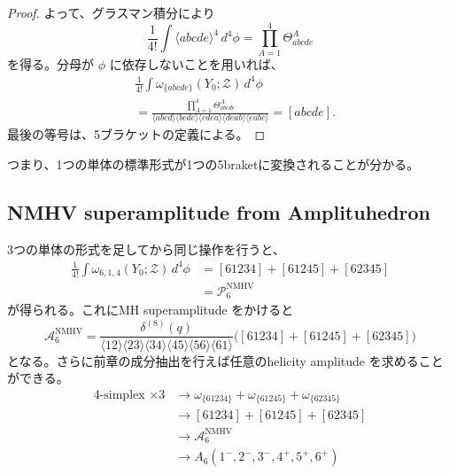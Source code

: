 \documentclass[uplatex,dvipdfmx,a4paper,11pt]{jsarticle}
\renewcommand{\proofname}{Proof}
\newenvironment{myproof}[1][\proofname]
  {\begin{proof}[#1]}
  {\end{proof}}
\numberwithin{equation}{section}
\begin{document}
\begin{myproof}
  よって、グラスマン積分により
  \[
    \frac1{4!}
    \int\langle abcde\rangle^4\,d^4\phi
      =
      \prod_{A=1}^{4}\Theta_{abcde}^A
  \]
  を得る。分母が $\phi$ に依存しないことを用いれば、
  \[
    \begin{aligned}
      &\frac1{4!}
      \int
      \omega_{\{abcde\}}(Y_0;\mathcal Z)\,d^4\phi\\
      &=
      \frac{
        \displaystyle\prod_{A=1}^{4}\Theta_{abcde}^A
      }{
        \langle abcd\rangle
        \langle bcde\rangle
        \langle cdea\rangle
        \langle deab\rangle
        \langle eabc\rangle
      }=[abcde].
    \end{aligned}
  \]
  最後の等号は、5ブラケットの定義による。
\end{myproof}
つまり、1つの単体の標準形式が1つの5braketに変換されることが分かる。
\subsection{NMHV superamplitude from Amplituhedron}
3つの単体の形式を足してから同じ操作を行うと、
\[
\begin{aligned}
\frac1{4!}
\int
\omega_{6,1,4}(Y_0;\mathcal Z)\,d^4\phi
&=
[61234]+[61245]+[62345]\\
&=
\mathcal P_6^{\mathrm{NMHV}}
\end{aligned}
\]
が得られる。これにMH superamplitude をかけると
\[
\mathcal A_6^{\mathrm{NMHV}}
=
\frac{\delta^{(8)}(q)}
{\langle12\rangle\langle23\rangle
\langle34\rangle\langle45\rangle
\langle56\rangle\langle61\rangle}
\bigl(
[61234]+[61245]+[62345]
\bigr)
\]
となる。さらに前章の成分抽出を行えば任意のhelicity amplitude を求めることができる。
\[
\begin{aligned}
\text{4-simplex $\times 3$}
&\longrightarrow
\omega_{\{61234\}}
+\omega_{\{61245\}}
+\omega_{\{62345\}}\\
&\longrightarrow
[61234]+[61245]+[62345]\\
&\longrightarrow
\mathcal A_6^{\mathrm{NMHV}}\\
&\longrightarrow
A_6(1^-,2^-,3^-,4^+,5^+,6^+)
\end{aligned}
\]
\end{document}
